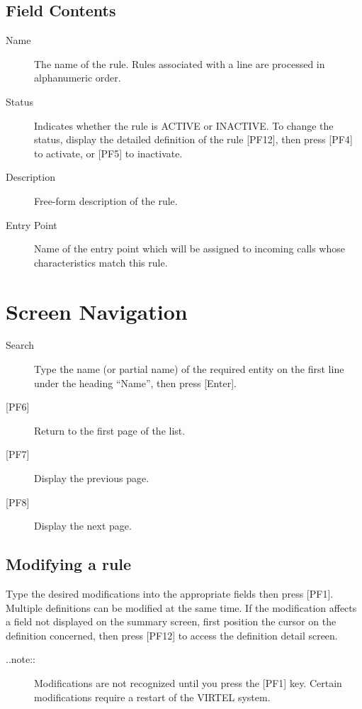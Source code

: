 \documentclass[letterpaper,10pt,english]{sphinxmanual}
\begin{document}
\subsection{Field Contents}
\label{\detokenize{connectivity_guide:field-contents}}\begin{description}
\item[{Name}] \leavevmode
The name of the rule. Rules associated with a line are processed in alphanumeric order.

\item[{Status}] \leavevmode
Indicates whether the rule is ACTIVE or INACTIVE. To change the status, display the detailed definition of the rule {[}PF12{]}, then press {[}PF4{]} to activate, or {[}PF5{]} to inactivate.

\item[{Description}] \leavevmode
Free-form description of the rule.

\item[{Entry Point}] \leavevmode
Name of the entry point which will be assigned to incoming calls whose characteristics match this rule.

\end{description}


\section{Screen Navigation}
\label{\detokenize{connectivity_guide:screen-navigation}}\begin{description}
\item[{Search}] \leavevmode
Type the name (or partial name) of the required entity on the first line under the heading “Name”, then press {[}Enter{]}.

\item[{{[}PF6{]}}] \leavevmode
Return to the first page of the list.

\item[{{[}PF7{]}}] \leavevmode
Display the previous page.

\item[{{[}PF8{]}}] \leavevmode
Display the next page.

\end{description}


\subsection{Modifying a rule}
\label{\detokenize{connectivity_guide:modifying-a-rule}}
Type the desired modifications into the appropriate fields then press {[}PF1{]}. Multiple definitions can be modified at the same time. If the modification affects a field not displayed on the summary screen, first position the cursor on the definition concerned, then press {[}PF12{]} to access the definition detail screen.
\begin{description}
\item[{..note::}] \leavevmode
Modifications are not recognized until you press the {[}PF1{]} key. Certain modifications require a restart of the VIRTEL system.

\end{description}
\end{document}
